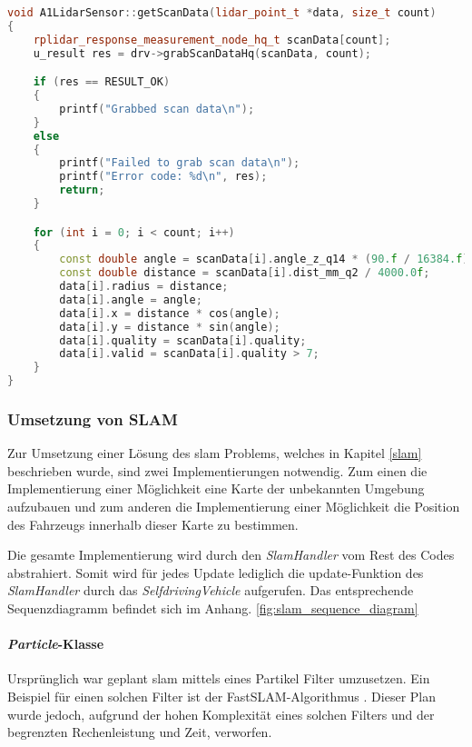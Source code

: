 \begin{lstlisting}[caption={Auslesen der LiDAR Daten},label={lst:auslesen_lidar},language={C++}]
void A1LidarSensor::getScanData(lidar_point_t *data, size_t count)
{
    rplidar_response_measurement_node_hq_t scanData[count];
    u_result res = drv->grabScanDataHq(scanData, count);

    if (res == RESULT_OK)
    {
        printf("Grabbed scan data\n");
    }
    else
    {
        printf("Failed to grab scan data\n");
        printf("Error code: %d\n", res);
        return;
    }

    for (int i = 0; i < count; i++)
    {
        const double angle = scanData[i].angle_z_q14 * (90.f / 16384.f);
        const double distance = scanData[i].dist_mm_q2 / 4000.0f;
        data[i].radius = distance;
        data[i].angle = angle;
        data[i].x = distance * cos(angle);
        data[i].y = distance * sin(angle);
        data[i].quality = scanData[i].quality;
        data[i].valid = scanData[i].quality > 7;
    }
}
\end{lstlisting}

\subsubsection{Umsetzung von SLAM}
\label{slamImplementierung}

Zur Umsetzung einer Lösung des \ac{slam} Problems, welches in Kapitel \ref{slam} beschrieben wurde, sind zwei Implementierungen notwendig.
Zum einen die Implementierung einer Möglichkeit eine Karte der unbekannten Umgebung aufzubauen 
und zum anderen die Implementierung einer Möglichkeit die Position des Fahrzeugs innerhalb dieser Karte zu bestimmen.

Die gesamte Implementierung wird durch den \textit{SlamHandler} vom Rest des Codes abstrahiert.
Somit wird für jedes Update lediglich die update-Funktion des \textit{SlamHandler} durch das \textit{SelfdrivingVehicle} aufgerufen.
Das entsprechende Sequenzdiagramm befindet sich im Anhang. \ref{fig:slam_sequence_diagram}

\paragraph{\textit{Particle}-Klasse} \mbox{}
Ursprünglich war geplant \ac{slam} mittels eines Partikel Filter umzusetzen.
Ein Beispiel für einen solchen Filter ist der FastSLAM-Algorithmus \cite{montemerlo2002fastslam}.
Dieser Plan wurde jedoch, aufgrund der hohen Komplexität eines solchen Filters und der begrenzten Rechenleistung und Zeit, verworfen.

